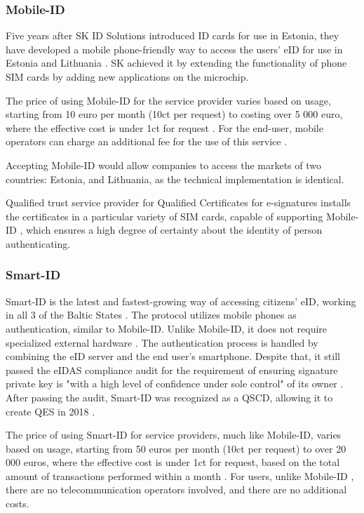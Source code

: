 \subsubsection{Mobile-ID}

Five years after SK ID Solutions introduced ID cards for use in Estonia, they have developed a mobile phone-friendly way to access the users' eID for use in Estonia and Lithuania \cite{sk-history2007}. SK achieved it by extending the functionality of phone SIM cards by adding new applications on the microchip.

The price of using Mobile-ID for the service provider varies based on usage, starting from 10 euro per month (10ct per request) to costing over 5 000 euro, where the effective cost is under 1ct for request \cite{sk-mobileidpricing}. For the end-user, mobile operators can charge an additional fee for the use of this service \cite{telia-mobileid}.

Accepting Mobile-ID would allow companies to access the markets of two countries: Estonia, and Lithuania, as the technical implementation is identical.

Qualified trust service provider for Qualified Certificates for e-signatures installs the certificates in a particular variety of SIM cards, capable of supporting Mobile-ID \cite{eu-trustservices}, which ensures a high degree of certainty about the identity of person authenticating.


\subsubsection{Smart-ID}

Smart-ID is the latest and fastest-growing way of accessing citizens' eID, working in all 3 of the Baltic States \cite{sk-history2017}. The protocol utilizes mobile phones as authentication, similar to Mobile-ID. Unlike Mobile-ID, it does not require specialized external hardware \cite{smartid-docs}. The authentication process is handled by combining the eID server and the end user's smartphone. Despite that, it still passed the eIDAS compliance audit for the requirement of ensuring signature private key is "with a high level of confidence under sole control" of its owner \cite{enisa-eidasreq}. After passing the audit, Smart-ID was recognized as a QSCD, allowing it to create QES in 2018 \cite{smartid-qscd}.

The price of using Smart-ID for service providers, much like Mobile-ID, varies based on usage, starting from 50 euros per month (10ct per request) to over 20 000 euros, where the effective cost is under 1ct for request, based on the total amount of transactions performed within a month \cite{sk-smartidpricing}. For users, unlike Mobile-ID \cite{telia-mobileid}, there are no telecommunication operators involved, and there are no additional costs.

